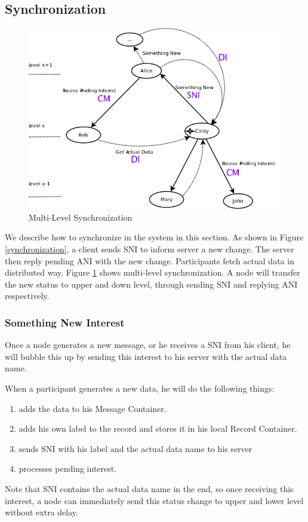 \documentclass[conference]{IEEEtran}
\begin{document}
\subsection{Synchronization}

\begin{figure}[!t]
\centering
\includegraphics[width=4.5in]{../png/tree-synchronization.png}
\caption{Multi-Level Synchronization}
\label{tree_synchronization}
\end{figure}
We describe how to synchronize in the system in this section.
As shown in Figure \ref{synchronization}, a client sends SNI to inform server a new change.
The server then reply pending ANI with the new change.
Participants fetch actual data in distributed way.
Figure \ref{tree_synchronization} shows multi-level synchronization.
A node will transfer the new status to upper and down level,
through sending SNI and replying ANI respectively.

\subsubsection{Something New Interest}
Once a node generates a new message, or he receives a SNI from his client,
he will bubble this up by sending this interest to his server with the actual data name.

When a participant generates a new data, he will do the following things:
\begin{enumerate}{}
	\item adds the data to his Message Container.
	\item adds his own label to the record and stores it in his local Record Container.
	\item sends SNI with his label and the actual data name to his server
	\item processes pending interest.
\end{enumerate}
Note that SNI contains the actual data name in the end,
so once receiving this interest,
a node can immediately send this status change to upper and lower level without extra delay.
\end{document}
